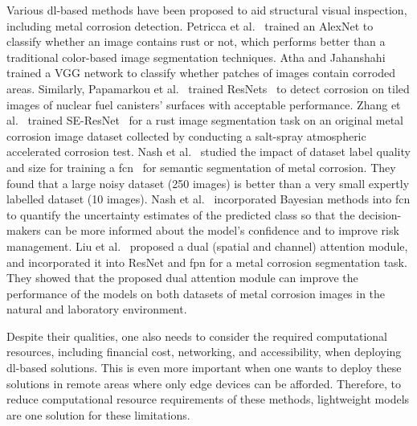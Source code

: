 \documentclass[mathematics,article,submit,pdftex,moreauthors]{Definitions/mdpi}
\begin{document}
Various \ac{dl}-based methods have been proposed
to aid structural visual inspection, including metal
corrosion detection. Petricca et al.~\cite{Petricca2016}
trained an AlexNet to classify whether
an image contains rust or not, which performs
better than a traditional color-based image segmentation
techniques. Atha and Jahanshahi~\cite{Atha2018}
trained a VGG network to classify whether patches
of images contain corroded areas. Similarly,
Papamarkou et al.~\cite{Papamarkou2021}
trained ResNets~\cite{He2016} to detect corrosion
on tiled images of nuclear fuel canisters' surfaces
with acceptable performance. Zhang et al.~\cite{Zhang2021}
trained SE-ResNet~\cite{Hu2018} for a
rust image segmentation task on an original metal
corrosion image dataset collected by conducting 
a salt-spray atmospheric accelerated corrosion test.
Nash et al.~\cite{Nash2019}
studied the impact of dataset label quality 
and size for training a \ac{fcn}~\cite{Long2015}
for semantic segmentation of metal corrosion. 
They found that a large noisy dataset (250 images)
is better than a very small expertly labelled 
dataset (10 images).
Nash et al.~\cite{Nash2022} incorporated
Bayesian methods into \ac{fcn}
to quantify the uncertainty estimates 
of the predicted class so that the decision-makers
can be more informed about the model's confidence and 
to improve risk management. Liu et al.~\cite{Liu2023}
proposed a dual (spatial and channel) attention module,
and incorporated it into ResNet and \ac{fpn} for a
metal corrosion segmentation task. They showed that
the proposed dual attention module can improve the performance
of the models on both datasets of metal corrosion
images in the natural and laboratory environment. 

Despite their qualities, one also needs to consider
the required computational resources, including
financial cost, networking, and accessibility,
when deploying \ac{dl}-based solutions.
This is even more important when one wants to 
deploy these solutions in remote
areas where only edge devices can be afforded.
Therefore, to reduce computational resource requirements
of these methods, lightweight 
models are one solution for these limitations.
\end{document}
